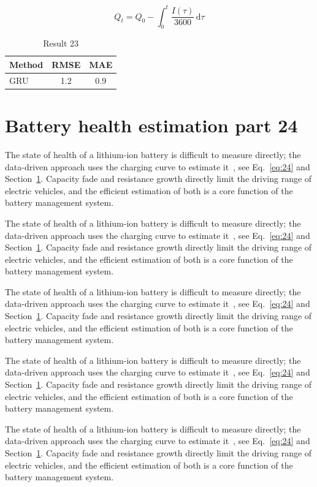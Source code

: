 \documentclass[11pt]{article}
\begin{document}
\begin{equation}\label{eq:23}
  Q_t = Q_0 - \int_0^t \frac{I(\tau)}{3600}\,\mathrm{d}\tau
\end{equation}
\begin{table}[h]\centering\begin{tabular}{lcc}\toprule Method & RMSE & MAE\\\midrule GRU & 1.2 & 0.9\\\bottomrule\end{tabular}\caption{Result 23}\end{table}

\section{Battery health estimation part 24}\label{sec:24}
The state of health of a lithium-ion battery is difficult to measure directly; the data-driven approach uses the charging curve to estimate it~\cite{a2020}, see Eq.~\eqref{eq:24} and Section~\ref{sec:24}. Capacity fade and resistance growth directly limit the driving range of electric vehicles, and the efficient estimation of both is a core function of the battery management system.

The state of health of a lithium-ion battery is difficult to measure directly; the data-driven approach uses the charging curve to estimate it~\cite{a2020}, see Eq.~\eqref{eq:24} and Section~\ref{sec:24}. Capacity fade and resistance growth directly limit the driving range of electric vehicles, and the efficient estimation of both is a core function of the battery management system.

The state of health of a lithium-ion battery is difficult to measure directly; the data-driven approach uses the charging curve to estimate it~\cite{a2020}, see Eq.~\eqref{eq:24} and Section~\ref{sec:24}. Capacity fade and resistance growth directly limit the driving range of electric vehicles, and the efficient estimation of both is a core function of the battery management system.

The state of health of a lithium-ion battery is difficult to measure directly; the data-driven approach uses the charging curve to estimate it~\cite{a2020}, see Eq.~\eqref{eq:24} and Section~\ref{sec:24}. Capacity fade and resistance growth directly limit the driving range of electric vehicles, and the efficient estimation of both is a core function of the battery management system.

The state of health of a lithium-ion battery is difficult to measure directly; the data-driven approach uses the charging curve to estimate it~\cite{a2020}, see Eq.~\eqref{eq:24} and Section~\ref{sec:24}. Capacity fade and resistance growth directly limit the driving range of electric vehicles, and the efficient estimation of both is a core function of the battery management system.
\end{document}
